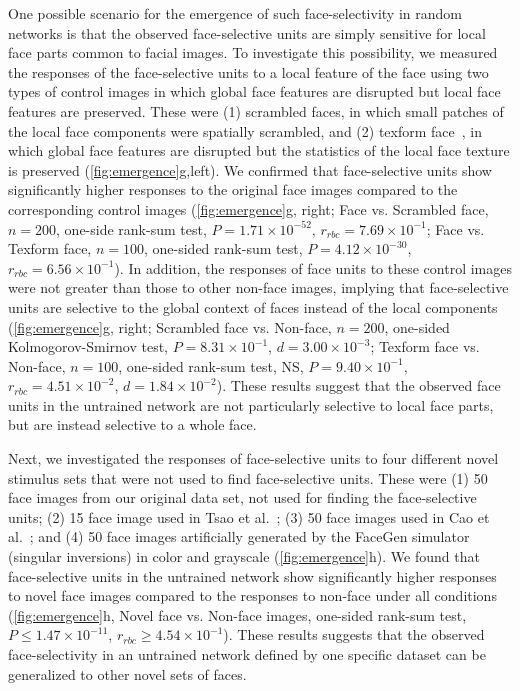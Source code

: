 \documentclass[sn-mathphys-num]{sn-jnl}%
\theoremstyle{thmstyleone}%
\theoremstyle{thmstyletwo}%
\theoremstyle{thmstylethree}%
\begin{document}
One possible scenario for the emergence of such face-selectivity in random networks is that the observed face-selective units are simply sensitive for local face parts common to facial images.
To investigate this possibility, we measured the responses of the face-selective units to a local feature of the face using two types of control images in which global face features are disrupted but local face features are preserved.
These were (1) scrambled faces, in which small patches of the local face components were spatially scrambled, and (2) texform face~\cite{long2018mid}, in which global face features are disrupted but the statistics of the local face texture is preserved (\ref{fig:emergence}g,left).
We confirmed that face-selective units show significantly higher responses to the original face images compared to the corresponding control images (\ref{fig:emergence}g, right; 
Face vs. Scrambled face, $ n=200 $, one-side rank-sum test, $ P=1.71 \times 10^{-52} $, $ r_{rbc}=7.69 \times 10^{-1} $;
Face vs. Texform face, $ n=100 $, one-sided rank-sum test, $ P=4.12\times10^{-30} $, $ r_{rbc}=6.56\times 10^{-1} $).
In addition, the responses of face units to these control images were not greater than those to other non-face images, implying that face-selective units are selective to the global context of faces instead of the local components (\ref{fig:emergence}g, right; Scrambled face vs. Non-face, $ n=200 $, one-sided Kolmogorov-Smirnov test, $ P=8.31 \times 10^{-1} $, $ d=3.00 \times 10^{-3} $; 
Texform face vs. Non-face, $ n=100 $, one-sided rank-sum test, NS, $ P=9.40 \times 10^{-1} $, $ r_{rbc}=4.51 \times 10^{-2} $, $ d=1.84 \times 10^{-2} $).
These results suggest that the observed face units in the untrained network are not particularly selective to local face parts, but are instead selective to a whole face.


Next, we investigated the responses of face-selective units to four different novel stimulus sets that were not used to find face-selective units.
These were
(1) 50 face images from our original data set, not used for finding the face-selective units;
(2) 15 face image used in Tsao et al.~\cite{tsao2006cortical,freiwald2010functional};
(3) 50 face images used in Cao et al.~\cite{cao2018vggface2};
and (4) 50 face images artificially generated by the FaceGen simulator (singular inversions) in color and grayscale (\ref{fig:emergence}h).
We found that face-selective units in the untrained network show significantly higher responses to novel face images compared to the responses to non-face under all conditions (\ref{fig:emergence}h, Novel face vs. Non-face images, one-sided rank-sum test, $ P \leq 1.47 \times 10^{-11} $, $ r_{rbc} \geq 4.54 \times 10^{-1}$).
These results suggests that the observed face-selectivity in an untrained network defined by one specific dataset can be generalized to other novel sets of faces.
\end{document}
